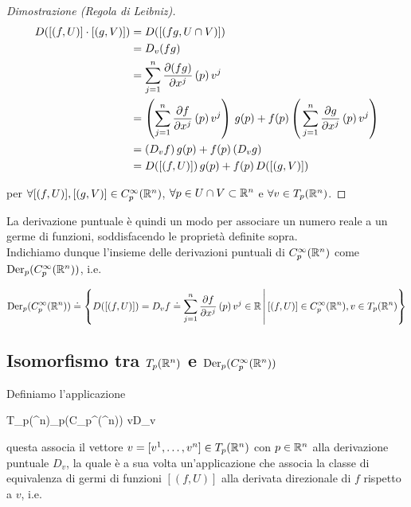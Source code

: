 \begin{proof}[Dimostrazione (Regola di Leibniz)]
	\begin{align}
		\begin{split}
			D ([(f,U)] \cdot [(g,V)]) &= D ([(f g,U \cap V)])\\
			&= D_{v} (f g)\\
			&= \sum_{j=1}^{n} \pdv{(f g)}{x^{j}} \, (p) \, v^{j}\\
			&= \left( \sum_{j=1}^{n} \pdv{f}{x^{j}} \, (p) \, v^{j} \right) \, g(p) + f(p) \left( \, \sum_{j=1}^{n} \pdv{g}{x^{j}} \, (p) \, v^{j} \right)\\
			&= (D_{v} f) \, g(p) + f(p) \, (D_{v} g)\\
			&= D ([(f,U)]) \, g(p) + f(p) \, D ([(g,V)])
		\end{split}
	\end{align}

	per $ \forall [(f,U)], [(g,V)] \in C_{p}^{\infty}(\mathbb{R}^{n}) $, $ \forall p \in U \cap V \subset \mathbb{R}^{n} $ e $ \forall v \in T_{p} (\mathbb{R}^{n}) $.
\end{proof}

La derivazione puntuale è quindi un modo per associare un numero reale a un germe di funzioni, soddisfacendo le proprietà definite sopra.\\
Indichiamo dunque l'insieme delle derivazioni puntuali di $ C_{p}^{\infty}(\mathbb{R}^{n}) $ come $ \operatorname{Der}_{p}(C_{p}^{\infty}(\mathbb{R}^{n})) $, i.e.

\begin{equation}
	\operatorname{Der}_{p}(C_{p}^{\infty}(\mathbb{R}^{n})) \doteq \left\{ D ([(f,U)]) = D_{v} f \doteq \sum_{j=1}^{n} \pdv{f}{x^{j}} \, (p) \, v^{j} \in \mathbb{R} \, \middle| \, [(f,U)] \in C_{p}^{\infty}(\mathbb{R}^{n}), v \in T_{p} (\mathbb{R}^{n}) \right\}
\end{equation}

\subsection{Isomorfismo tra $ T_{p}(\mathbb{R}^{n}) $ e $ \operatorname{Der}_{p}(C_{p}^{\infty}(\mathbb{R}^{n})) $}

Definiamo l'applicazione

\map{\phi}
	{T_{p}(\R^{n})}{\der_{p}(C_{p}^{\infty}(\R^{n}))}
	{v}{D_{v}}

questa associa il vettore $ v = [v^{1},\dots,v^{n}] \in T_{p}(\mathbb{R}^{n}) $ con $ p \in \mathbb{R}^{n} $ alla derivazione puntuale $ D_{v} $, la quale è a sua volta un'applicazione che associa la classe di equivalenza di germi di funzioni $ [(f,U)] $ alla derivata direzionale di $ f $ rispetto a $ v $, i.e.

